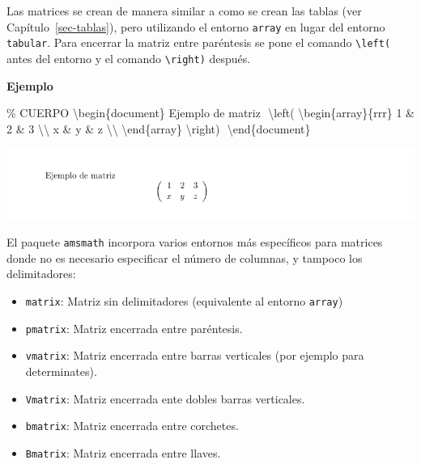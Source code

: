 \documentclass[
  letterpaper,
  DIV=11,
  numbers=noendperiod]{scrreport}
\newenvironment{Shaded}{\begin{snugshade}}{\end{snugshade}}
\newcommand{\CommentTok}[1]{\textcolor[rgb]{0.37,0.37,0.37}{#1}}
\newcommand{\ExtensionTok}[1]{\textcolor[rgb]{0.00,0.23,0.31}{#1}}
\newcommand{\KeywordTok}[1]{\textcolor[rgb]{0.00,0.23,0.31}{#1}}
\newcommand{\NormalTok}[1]{\textcolor[rgb]{0.00,0.23,0.31}{#1}}
\newcommand{\SpecialCharTok}[1]{\textcolor[rgb]{0.37,0.37,0.37}{#1}}
\newcommand{\SpecialStringTok}[1]{\textcolor[rgb]{0.13,0.47,0.30}{#1}}
\providecommand{\tightlist}{%
  \setlength{\itemsep}{0pt}\setlength{\parskip}{0pt}}\usepackage{longtable,booktabs,array}
\begin{document}
Las matrices se crean de manera similar a como se crean las tablas (ver
Capítulo~\ref{sec-tablas}), pero utilizando el entorno \texttt{array} en
lugar del entorno \texttt{tabular}. Para encerrar la matriz entre
paréntesis se pone el comando \texttt{\textbackslash{}left(} antes del
entorno y el comando \texttt{\textbackslash{}right)} después.

\textbf{Ejemplo}

\begin{Shaded}
\begin{Highlighting}[]
\CommentTok{\% CUERPO}
\KeywordTok{\textbackslash{}begin}\NormalTok{\{}\ExtensionTok{document}\NormalTok{\}}
\NormalTok{Ejemplo de matriz}
\SpecialStringTok{$$}
\SpecialCharTok{\textbackslash{}left}\SpecialStringTok{(}
\KeywordTok{\textbackslash{}begin}\NormalTok{\{}\ExtensionTok{array}\NormalTok{\}}\SpecialStringTok{\{rrr\}}
\SpecialStringTok{1 \& 2 \& 3 }\SpecialCharTok{\textbackslash{}\textbackslash{}}
\SpecialStringTok{x \& y \& z }\SpecialCharTok{\textbackslash{}\textbackslash{}}
\KeywordTok{\textbackslash{}end}\NormalTok{\{}\ExtensionTok{array}\NormalTok{\}}
\SpecialCharTok{\textbackslash{}right}\SpecialStringTok{)}
\SpecialStringTok{$$}
\KeywordTok{\textbackslash{}end}\NormalTok{\{}\ExtensionTok{document}\NormalTok{\}}
\end{Highlighting}
\end{Shaded}

\begin{tcolorbox}[enhanced jigsaw, colback=white, colframe=quarto-callout-note-color-frame, title={Salida}, bottomtitle=1mm, colbacktitle=quarto-callout-note-color!10!white, bottomrule=.15mm, titlerule=0mm, opacityback=0, toptitle=1mm, arc=.35mm, left=2mm, rightrule=.15mm, toprule=.15mm, coltitle=black, leftrule=.75mm, opacitybacktitle=0.6, breakable]
\includegraphics{./img/formulas/matriz.png}
\end{tcolorbox}

El paquete \texttt{amsmath} incorpora varios entornos más específicos
para matrices donde no es necesario especificar el número de columnas, y
tampoco los delimitadores:

\begin{itemize}
\tightlist
\item
  \texttt{matrix}: Matriz sin delimitadores (equivalente al entorno
  \texttt{array})
\item
  \texttt{pmatrix}: Matriz encerrada entre paréntesis.
\item
  \texttt{vmatrix}: Matriz encerrada entre barras verticales (por
  ejemplo para determinates).
\item
  \texttt{Vmatrix}: Matriz encerrada ente dobles barras verticales.
\item
  \texttt{bmatrix}: Matriz encerrada entre corchetes.
\item
  \texttt{Bmatrix}: Matriz encerrada entre llaves.
\end{itemize}
\end{document}
